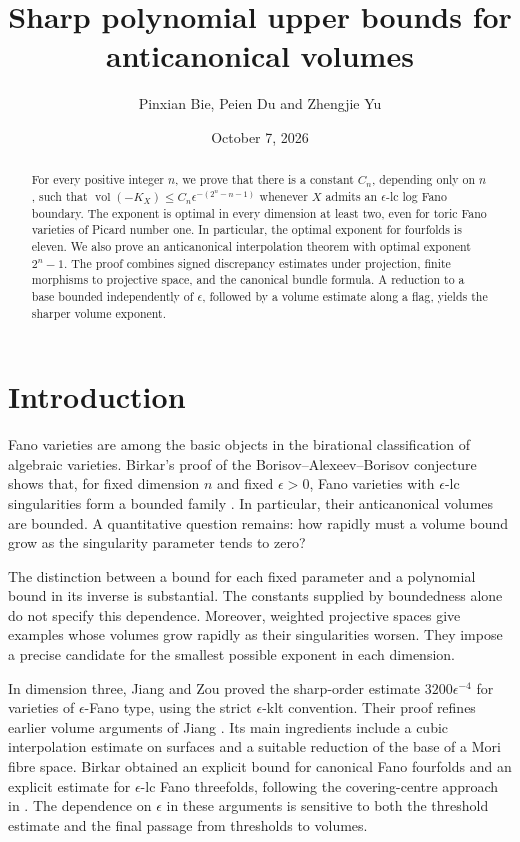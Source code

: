 \documentclass[11pt,reqno]{amsart}
\title[Sharp polynomial anticanonical volume bounds]{Sharp polynomial upper bounds for anticanonical volumes}
\author{Pinxian Bie, Peien Du and Zhengjie Yu}
\date{October 7, 2026}
\numberwithin{equation}{section}
\theoremstyle{definition}
\theoremstyle{remark}
\newcommand{\eps}{\epsilon}
\newcommand{\vol}{\operatorname{vol}}
\begin{document}
\begin{abstract}
For every positive integer $n$, we prove that there is a constant $C_n$, depending only on $n$, such that
$\vol(-K_X)\le C_n\eps^{-(2^n-n-1)}$
whenever $X$ admits an $\eps$-lc log Fano boundary. The exponent is optimal in every dimension at least two, even for toric Fano varieties of Picard number one. In particular, the optimal exponent for fourfolds is eleven. We also prove an anticanonical interpolation theorem with optimal exponent $2^n-1$. The proof combines signed discrepancy estimates under projection, finite morphisms to projective space, and the canonical bundle formula. A reduction to a base bounded independently of $\eps$, followed by a volume estimate along a flag, yields the sharper volume exponent.
\end{abstract}
\maketitle
\setcounter{tocdepth}{1}
\tableofcontents

\section{Introduction}\label{sec:intro}

Fano varieties are among the basic objects in the birational classification of algebraic varieties. Birkar's proof of the Borisov--Alexeev--Borisov conjecture shows that, for fixed dimension $n$ and fixed $\eps>0$, Fano varieties with $\eps$-lc singularities form a bounded family \cite{Bir19,Bir21}. In particular, their anticanonical volumes are bounded. A quantitative question remains: how rapidly must a volume bound grow as the singularity parameter tends to zero?

The distinction between a bound for each fixed parameter and a polynomial bound in its inverse is substantial. The constants supplied by boundedness alone do not specify this dependence. Moreover, weighted projective spaces give examples whose volumes grow rapidly as their singularities worsen. They impose a precise candidate for the smallest possible exponent in each dimension.

In dimension three, Jiang and Zou \cite[Theorem~1.1]{JZ24} proved the sharp-order estimate $3200\eps^{-4}$ for varieties of $\eps$-Fano type, using the strict $\eps$-klt convention. Their proof refines earlier volume arguments of Jiang \cite{Jiang21}. Its main ingredients include a cubic interpolation estimate on surfaces and a suitable reduction of the base of a Mori fibre space. Birkar \cite{Bir4} obtained an explicit bound for canonical Fano fourfolds and an explicit estimate for $\eps$-lc Fano threefolds, following the covering-centre approach in \cite{Bir19}. The dependence on $\eps$ in these arguments is sensitive to both the threshold estimate and the final passage from thresholds to volumes.
\end{document}
